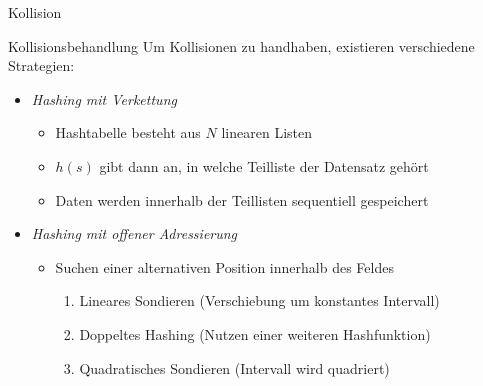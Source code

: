 \begin{defi}{Kollision}
\begin{center}
    \end{center}

\end{defi}

\begin{defi}{Kollisionsbehandlung}
    Um Kollisionen zu handhaben, existieren verschiedene Strategien:
    \begin{itemize}
        \item \emph{Hashing mit Verkettung}
              \begin{itemize}
                  \item Hashtabelle besteht aus $N$ linearen Listen
                  \item $h(s)$ gibt dann an, in welche Teilliste der Datensatz gehört
                  \item Daten werden innerhalb der Teillisten sequentiell gespeichert
              \end{itemize}
        \item \emph{Hashing mit offener Adressierung}
              \begin{itemize}
                  \item Suchen einer alternativen Position innerhalb des Feldes
                        \begin{enumerate}
                            \item Lineares Sondieren (Verschiebung um konstantes Intervall)
                            \item Doppeltes Hashing (Nutzen einer weiteren Hashfunktion)
                            \item Quadratisches Sondieren (Intervall wird quadriert)
                        \end{enumerate}
              \end{itemize}
    \end{itemize}
\end{defi}

